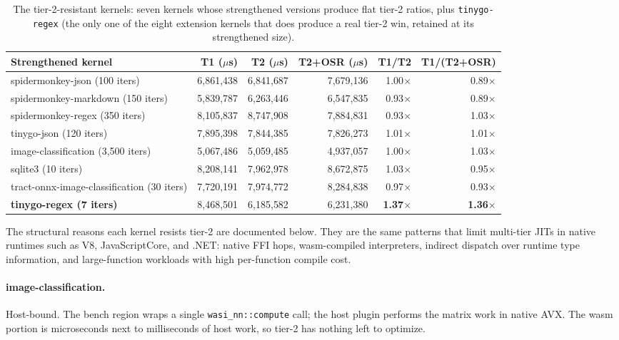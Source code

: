 \begin{table}[h]
\centering
\small
\begin{tabular}{l r r r r r}
\toprule
Strengthened kernel & T1 ($\mu$s) & T2 ($\mu$s) & T2+OSR ($\mu$s) & T1/T2 & T1/(T2+OSR) \\
\midrule
spidermonkey-json (100 iters)             & 6{,}861{,}438 & 6{,}841{,}687 & 7{,}679{,}136 & 1.00$\times$ & 0.89$\times$ \\
spidermonkey-markdown (150 iters)         & 5{,}839{,}787 & 6{,}263{,}446 & 6{,}547{,}835 & 0.93$\times$ & 0.89$\times$ \\
spidermonkey-regex (350 iters)            & 8{,}105{,}837 & 8{,}747{,}908 & 7{,}884{,}831 & 0.93$\times$ & 1.03$\times$ \\
tinygo-json (120 iters)                   & 7{,}895{,}398 & 7{,}844{,}385 & 7{,}826{,}273 & 1.01$\times$ & 1.01$\times$ \\
image-classification (3{,}500 iters)      & 5{,}067{,}486 & 5{,}059{,}485 & 4{,}937{,}057 & 1.00$\times$ & 1.03$\times$ \\
sqlite3 (10 iters)                        & 8{,}208{,}141 & 7{,}962{,}978 & 8{,}672{,}875 & 1.03$\times$ & 0.95$\times$ \\
tract-onnx-image-classification (30 iters) & 7{,}720{,}191 & 7{,}974{,}772 & 8{,}284{,}838 & 0.97$\times$ & 0.93$\times$ \\
\midrule
\textbf{tinygo-regex (7 iters)} & 8{,}468{,}501 & 6{,}185{,}582 & 6{,}231{,}380 & \textbf{1.37$\times$} & \textbf{1.36$\times$} \\
\bottomrule
\end{tabular}
\caption{The tier-2-resistant kernels: seven kernels whose strengthened versions produce flat tier-2 ratios, plus \texttt{tinygo-regex} (the only one of the eight extension kernels that does produce a real tier-2 win, retained at its strengthened size).}
\label{tbl:appA:neg}
\end{table}

The structural reasons each kernel resists tier-2 are documented below. They are the same patterns that limit multi-tier JITs in native runtimes such as V8, JavaScriptCore, and .NET: native FFI hops, wasm-compiled interpreters, indirect dispatch over runtime type information, and large-function workloads with high per-function compile cost.

\paragraph{image-classification.} Host-bound. The bench region wraps a single \texttt{wasi\_nn::compute} call; the host plugin performs the matrix work in native AVX. The wasm portion is microseconds next to milliseconds of host work, so tier-2 has nothing left to optimize.

